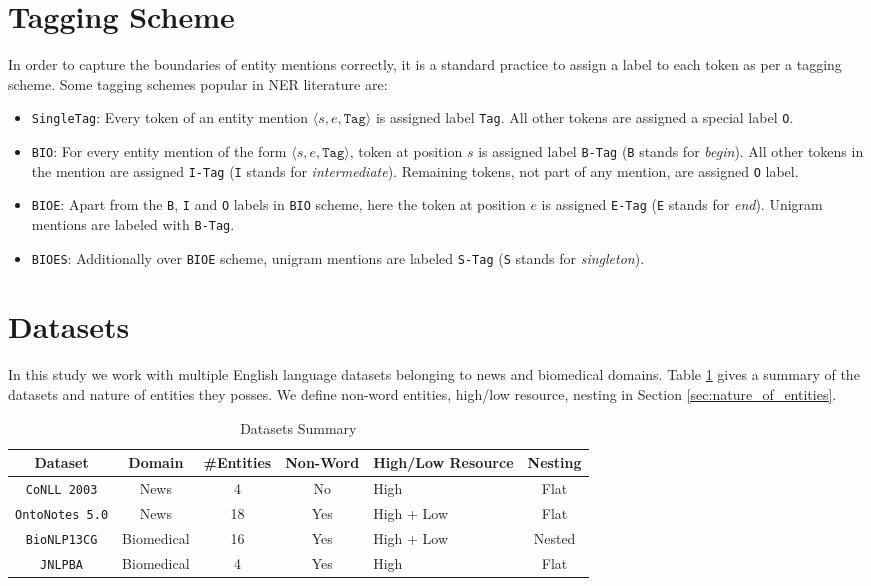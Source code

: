 \section{Tagging Scheme}
\label{sec:tagging_scheme}
In order to capture the boundaries of entity mentions correctly, it is a standard practice to assign a label to each token as per a tagging scheme. Some tagging schemes popular in NER literature are:

\begin{itemize}
    \item \texttt{SingleTag}: Every token of an entity mention $\langle s, e, \texttt{Tag} \rangle$ is assigned label \texttt{Tag}. All other tokens are assigned a special label \texttt{O}.
    
    \item \texttt{BIO}: For every entity mention of the form $\langle s, e, \texttt{Tag} \rangle$, token at position $s$ is assigned label \texttt{B-Tag} (\texttt{B} stands for \textit{begin}). All other tokens in the mention are assigned \texttt{I-Tag} (\texttt{I} stands for \textit{intermediate}). Remaining tokens, not part of any mention, are assigned \texttt{O} label. 
    
    \item \texttt{BIOE}: Apart from the \texttt{B}, \texttt{I} and \texttt{O} labels in \texttt{BIO} scheme, here the token at position $e$ is assigned \texttt{E-Tag} (\texttt{E} stands for \textit{end}). Unigram mentions are labeled with \texttt{B-Tag}.
    
    \item \texttt{BIOES}: Additionally over \texttt{BIOE} scheme, unigram mentions are labeled \texttt{S-Tag} (\texttt{S} stands for \textit{singleton}).
\end{itemize}

\section{Datasets}
\label{sec:datasets}
In this study we work with multiple English language datasets belonging to news and biomedical domains. Table \ref{tab:datasets_summary} gives a summary of the datasets and nature of entities they posses. We define non-word entities, high/low resource, nesting in Section \ref{sec:nature_of_entities}.

\begin{table}[h!]
	\begin{tabular}{|c|c|c|c|p{6em}|c|}\hline
	\textbf{Dataset} & \textbf{Domain} & \textbf{\#Entities} & \textbf{Non-Word} & \textbf{High/Low Resource} & \textbf{Nesting}\\\hline
	\texttt{CoNLL 2003} & News & 4 & No & High & Flat\\\hline
	\texttt{OntoNotes 5.0} & News & 18 & Yes & High + Low & Flat\\\hline
	\texttt{BioNLP13CG} & Biomedical & 16 & Yes & High + Low & Nested\\\hline
	\texttt{JNLPBA} & Biomedical & 4 & Yes & High & Flat\\\hline
	\end{tabular}
	\caption{Datasets Summary}
	\label{tab:datasets_summary}
\end{table}


